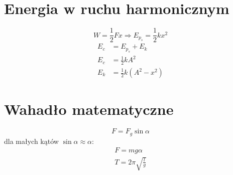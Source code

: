     \section{Energia w ruchu harmonicznym}
      \begin{equation}
        W = \frac{1}{2}Fx \Rightarrow E_{p_s} = \frac{1}{2}kx^2
      \end{equation}
      \begin{align}
        E_c &= E_{p_s} + E_k\\
        E_c &= \frac{1}{2}kA^2\\
        E_k &= \frac{1}{2}k(A^2 - x^2)
      \end{align}
    \section{Wahadło matematyczne}
      \begin{equation}
        F = F_g\sin\alpha
      \end{equation}
      dla małych kątów $\sin\alpha\approx\alpha$:
      \begin{gather}
        F = mg\alpha\\
        T = 2\pi\sqrt{\frac lg}
      \end{gather}
